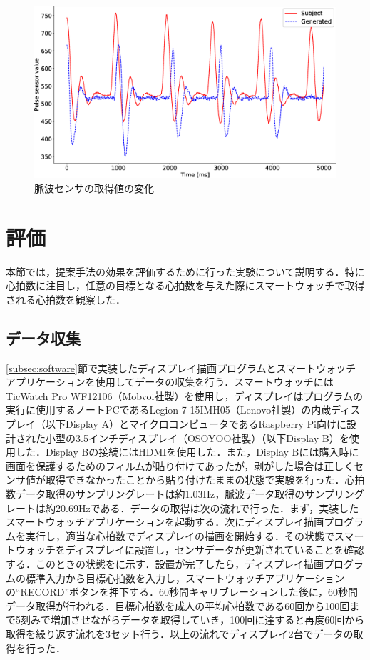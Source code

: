 \documentclass[Japanese,noauthor]{dicomopapers}
\begin{document}
\begin{figure}[!t]
	\begin{center}
		\includegraphics[width=1\linewidth]{figures/preliminary_pulse.eps}
	\end{center}
	\caption{脈波センサの取得値の変化}
	\label{fig:preliminary_pulse}
\end{figure}



\section{評価}
\label{sec:evaluation}
本節では，提案手法の効果を評価するために行った実験について説明する．特に心拍数に注目し，任意の目標となる心拍数を与えた際にスマートウォッチで取得される心拍数を観察した．


\subsection{データ収集}
\ref{subsec:software}節で実装したディスプレイ描画プログラムとスマートウォッチアプリケーションを使用してデータの収集を行う．スマートウォッチにはTicWatch Pro WF12106（Mobvoi社製）を使用し，ディスプレイはプログラムの実行に使用するノートPCであるLegion 7 15IMH05（Lenovo社製）の内蔵ディスプレイ（以下Display A）とマイクロコンピュータであるRaspberry Pi向けに設計された小型の3.5インチディスプレイ（OSOYOO社製）（以下Display B）を使用した．Display Bの接続にはHDMIを使用した．また，Display Bには購入時に画面を保護するためのフィルムが貼り付けてあったが，剥がした場合は正しくセンサ値が取得できなかったことから貼り付けたままの状態で実験を行った．心拍数データ取得のサンプリングレートは約1.03Hz，脈波データ取得のサンプリングレートは約20.69Hzである．データの取得は次の流れで行った．まず，実装したスマートウォッチアプリケーションを起動する．次にディスプレイ描画プログラムを実行し，適当な心拍数でディスプレイの描画を開始する．その状態でスマートウォッチをディスプレイに設置し，センサデータが更新されていることを確認する．このときの状態をに示す．設置が完了したら，ディスプレイ描画プログラムの標準入力から目標心拍数を入力し，スマートウォッチアプリケーションの``RECORD''ボタンを押下する．60秒間キャリブレーションした後に，60秒間データ取得が行われる．目標心拍数を成人の平均心拍数である60回から100回\cite{heart_rate_average}まで5刻みで増加させながらデータを取得していき，100回に達すると再度60回から取得を繰り返す流れを3セット行う．以上の流れでディスプレイ2台でデータの取得を行った．
\end{document}
